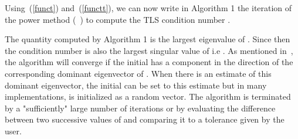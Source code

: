 \documentclass[a4paper]{article}
\begin{document}
Using~(\ref{funct}) and~(\ref{functt}), we can now write in Algorithm 1
the iteration of the power method (~\cite[p. 289]{HIGHAM}) to compute the TLS condition number .

\setlength{\fboxsep}{0.45cm}
\setlength{\fboxrule}{0.02cm}
\begin{center}
\end{center}
The quantity  computed by Algorithm 1 is the largest eigenvalue of .
Since  then the condition number  is also the largest singular value of  i.e .
As mentioned in~\cite[p. 331]{GOLUB}, the algorithm will converge if the initial  has a component in the direction of the corresponding dominant eigenvector of . When there is an estimate of this dominant eigenvector, the initial  can be set to this estimate but in many implementations,  is initialized as a random vector.
The algorithm is terminated by a "sufficiently" large number of iterations or by
evaluating the difference between two successive values of  and comparing it to a tolerance given by the user.
\end{document}
